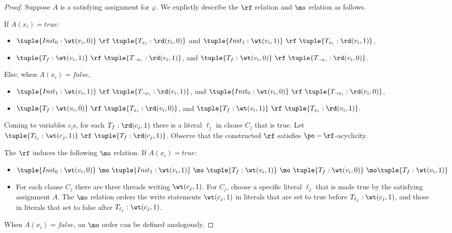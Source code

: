\begin{proof}
    Suppose $A$ is a satisfying assignment for $\varphi$. We explictly describe the $\rf$ relation and $\mo$ relation as follows. 
    
    If $A(x_i) = true$:
    \begin{itemize}[leftmargin=0.1em]
    \item $\tuple{Init_0: \wt(v_i, 0)}~\rf~\tuple{T_{x_i}: \rd(v_i, 0)}$ and $\tuple{Init_1: \wt(v_i, 1)}~\rf~\tuple{T_{x_i}: \rd(v_i, 1)}$,
    \item $\tuple{T_f: \wt(v_i, 1)}~\rf~\tuple{T_{\neg x_i}: \rd(v_i, 1)}$, and $\tuple{T_f: \wt(v_i, 0)}~\rf~\tuple{T_{\neg x_i}: \rd(v_i, 0)}$. 
    \end{itemize} 
    Else, when $A(x_i) = false$, 
    \begin{itemize}[leftmargin=0.1em]
    \item $\tuple{Init_1: \wt(v_i, 1)}~\rf~\tuple{T_{\neg x_i}: \rd(v_i, 1)}$, and $\tuple{Init_0: \wt(v_i, 0)}~\rf~\tuple{T_{\neg x_i}: \rd(v_i, 0)}$,
    \item $\tuple{T_f: \wt(v_i, 0)}~\rf~\tuple{T_{ x_i}: \rd(v_i, 0)}$, and $\tuple{T_f: \wt(v_i, 1)}~\rf~\tuple{T_{ x_i}: \rd(v_i, 1)}$. 
    \end{itemize} 
            
    Coming to variables $c_i$s, for each $T_f: \rd(c_j, 1)$ there is a literal $\ell_j$ in clause $C_j$ that is true. Let $\tuple{T_{\ell_j}: \wt(c_j, 1)}~\rf~ \tuple{T_f: \rd(c_j, 1)}$. Observe that the constructed $\rf$ satisfies $\po-\rf$-acyclicity.
    
    The $\rf$ induces the following $\mo$ relation. If $A(x_i) = true$: 
    \begin{itemize}[leftmargin=0.1em]
    \item $\tuple{Init_0: \wt(v_i, 0)} ~\mo~\tuple{Init_1: \wt(v_i, 1)} ~\mo~\tuple{T_f: \wt(v_i, 1)}~\mo~\tuple{T_f: \wt(v_i, 0)} ~\mo~\\ \tuple{T_f: \wt(v_i, 1)}$
    \item For each clause $C_j$ there are three threads writing $\wt(c_j, 1)$.  For $C_j$, choose a specific literal $\ell_j$ that is made true by the satisfying assignment $A$. 
    The $\mo$ relation orders the write statements $\wt(c_j, 1)$ in literals that are set to true before $T_{\ell_j}: \wt(c_j, 1)$, and those in literals that set to false after $T_{\ell_j}: \wt(c_j, 1)$.
    \end{itemize}  
    When $A(x_i) = false$, an $\mo$ order can be defined analogously. 


\end{proof}
